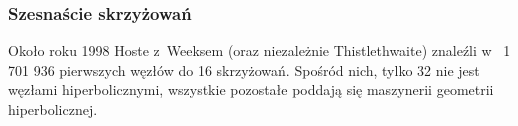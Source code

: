 \subsubsection{Szesnaście skrzyżowań}
Około roku 1998 Hoste z~Weeksem (oraz niezależnie Thistlethwaite) znaleźli w~\cite{thistlethwaite98} 1 701 936 pierwszych węzłów do 16 skrzyżowań.
%
%
%
Spośród nich, tylko 32 nie jest węzłami hiperbolicznymi, wszystkie pozostałe poddają się maszynerii geometrii hiperbolicznej.